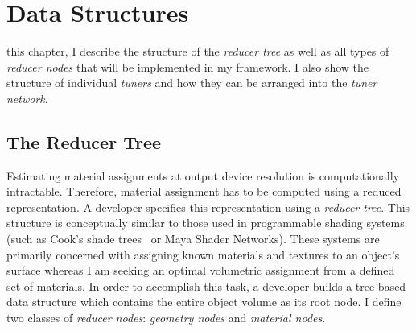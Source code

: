 \chapter{Data Structures}
\label{chap:struct}
 this chapter, I describe the structure of the \emph{reducer tree} as well as all types of \emph{reducer nodes} that will be implemented in my framework. I also show the structure of individual \emph{tuners} and how they can be arranged into the \emph{tuner network}.

\section{The Reducer Tree}
Estimating material assignments at output device resolution is computationally intractable.
Therefore, material assignment has to be computed using a reduced representation.
A developer specifies this representation using a \emph{reducer tree}.
This structure is conceptually similar to those used in programmable shading systems
(such as Cook's shade trees~ or Maya Shader Networks).
These systems are primarily concerned with assigning known materials and textures to an object's surface
whereas I am seeking an optimal volumetric assignment from a defined set of materials. 
In order to accomplish this task, a developer builds a tree-based data structure
which contains the entire object volume as its root node.
I define two classes of \emph{reducer nodes}: \emph{geometry nodes} and \emph{material nodes}.

